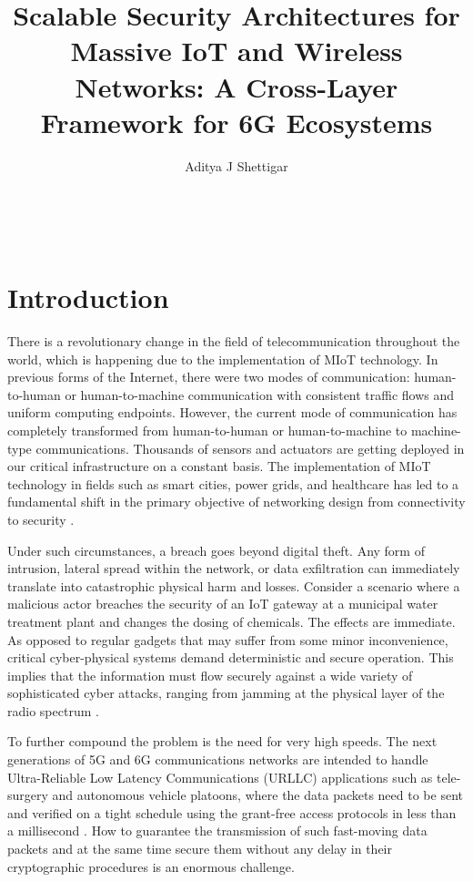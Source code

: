 \documentclass[12pt]{article}
\title{Scalable Security Architectures for Massive IoT and Wireless Networks: A Cross-Layer Framework for 6G Ecosystems}
\author{Aditya J Shettigar}
\date{}
\begin{document}
    \maketitle

    \

    \section{Introduction}
    There is a revolutionary change in the field of telecommunication throughout the world, which is happening due to the implementation of MIoT technology. In previous forms of the Internet, there were two modes of communication: human-to-human or human-to-machine communication with consistent traffic flows and uniform computing endpoints. However, the current mode of communication has completely transformed from human-to-human or human-to-machine to machine-type communications. Thousands of sensors and actuators are getting deployed in our critical infrastructure on a constant basis. The implementation of MIoT technology in fields such as smart cities, power grids, and healthcare has led to a fundamental shift in the primary objective of networking design from connectivity to security \cite{11358823, healthcare}. 

    Under such circumstances, a breach goes beyond digital theft. Any form of intrusion, lateral spread within the network, or data exfiltration can immediately translate into catastrophic physical harm and losses. Consider a scenario where a malicious actor breaches the security of an IoT gateway at a municipal water treatment plant and changes the dosing of chemicals. The effects are immediate. As opposed to regular gadgets that may suffer from some minor inconvenience, critical cyber-physical systems demand deterministic and secure operation. This implies that the information must flow securely against a wide variety of sophisticated cyber attacks, ranging from jamming at the physical layer of the radio spectrum \cite{namvar2016jamminginternetthingsgametheoretic}.

    To further compound the problem is the need for very high speeds. The next generations of 5G and 6G communications networks are intended to handle Ultra-Reliable Low Latency Communications (URLLC) applications such as tele-surgery and autonomous vehicle platoons, where the data packets need to be sent and verified on a tight schedule using the grant-free access protocols in less than a millisecond \cite{Liu2020AnalyzingGA}. How to guarantee the transmission of such fast-moving data packets and at the same time secure them without any delay in their cryptographic procedures is an enormous challenge.
\end{document}
